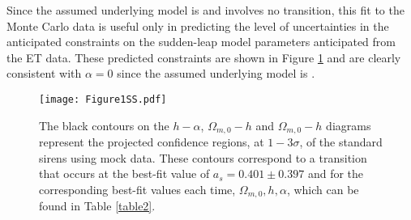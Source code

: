 \documentclass[universe,article,accept,moreauthors,pdftex]{Definitions/mdpi}
\begin{document}
Since the assumed underlying model is \plcdm and involves no transition, this fit to the Monte Carlo data is  useful only in predicting the level of uncertainties in the anticipated constraints on the sudden-leap model parameters anticipated from the ET data. These predicted constraints are shown in Figure \ref{Data1} and are clearly consistent with $\alpha=0$ since the assumed underlying model is \plcdm{}. 
  \begin{figure}[H] 
    \texttt{[image: Figure1SS.pdf]}
    \caption{The black contours on the $h-\alpha$, $\Omega_{m,0}-h$ and $\Omega_{m,0}-h$ diagrams represent the projected confidence regions, at $1-3\sigma$, of the standard sirens using mock data. These contours correspond to a transition that occurs at the best-fit value of $a_{s}=0.401 \pm0.397$ and for the corresponding best-fit values each time,  $\Omega_{m,0},h,\alpha$, which can be found in Table \ref{table2}. }
    \label{Data1}
\end{figure}
\end{document}
